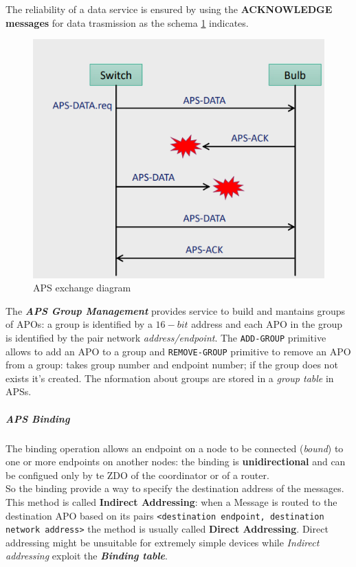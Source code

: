 \documentclass[10pt,a4paper]{report}
\theoremstyle{definition}
\begin{document}
The reliability of a data service is ensured by using the \textbf{ACKNOWLEDGE messages} for data trasmission as the schema \ref{zigbee-data-ack} indicates.
\begin{figure}[h!]
	\centering\includegraphics[scale=0.50]{images/Pasted image 20230311162150.png}
	\caption{APS exchange diagram}
	\label{zigbee-data-ack}
\end{figure}


The \textit{\textbf{APS Group Management}} provides service to build and mantains groups of APOs: a group is identified by a $16-bit$ address and each APO in the group is identified by the pair network \textit{address/endpoint}. The \texttt{ADD-GROUP} primitive allows to add an APO to a group and \texttt{REMOVE-GROUP} primitive to remove an APO from a group: takes group number and endpoint number; if the group does not exists it's created. The nformation about groups are stored in a \textit{group table} in APSs.

\subparagraph{APS Binding}\label{sec:aps-binding}
The binding operation allows an endpoint on a node to be connected (\textit{bound}) to one or more endpoints on another nodes: the binding is \textbf{unidirectional} and can be configued only by te ZDO of the coordinator or of a router. \\
So the binding provide a way to specify the destination address of the messages. This method is called \textbf{Indirect Addressing}: when a Message is routed to the destination APO based on its pairs \texttt{<destination endpoint, destination network address>} the method is usually called \textbf{Direct Addressing}. Direct addressing might be unsuitable for extremely simple devices while \textit{Indirect addressing} exploit the \textit{\textbf{Binding table}}.
\end{document}
